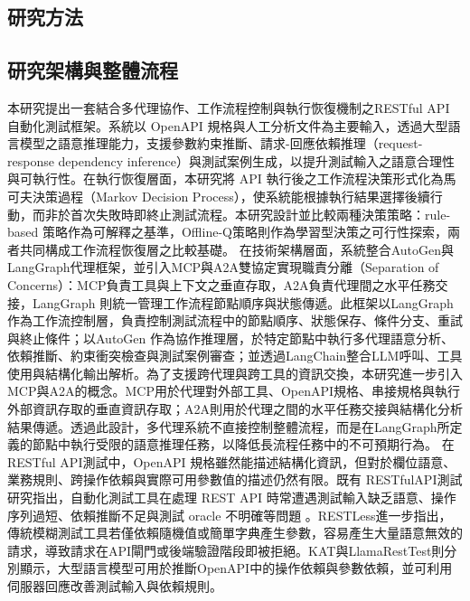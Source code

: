 \begin{ZhChapter}

\chapter{研究方法}

\section{研究架構與整體流程}

\text 本研究提出一套結合多代理協作、工作流程控制與執行恢復機制之RESTful API 自動化測試框架。系統以 OpenAPI 規格與人工分析文件為主要輸入，透過大型語言模型之語意推理能力，支援參數約束推斷、請求-回應依賴推理（request-response dependency inference）與測試案例生成，以提升測試輸入之語意合理性與可執行性。在執行恢復層面，本研究將 API 執行後之工作流程決策形式化為馬可夫決策過程（Markov Decision Process），使系統能根據執行結果選擇後續行動，而非於首次失敗時即終止測試流程。本研究設計並比較兩種決策策略：rule-based 策略作為可解釋之基準，Offline-Q策略則作為學習型決策之可行性探索，兩者共同構成工作流程恢復層之比較基礎。
\text 在技術架構層面，系統整合AutoGen與LangGraph代理框架，並引入MCP與A2A雙協定實現職責分離（Separation of Concerns）：MCP負責工具與上下文之垂直存取，A2A負責代理間之水平任務交接，LangGraph 則統一管理工作流程節點順序與狀態傳遞。\text 此框架以LangGraph作為工作流控制層，負責控制測試流程中的節點順序、狀態保存、條件分支、重試與終止條件；以AutoGen 作為協作推理層，於特定節點中執行多代理語意分析、依賴推斷、約束衝突檢查與測試案例審查；並透過LangChain整合LLM呼叫、工具使用與結構化輸出解析。為了支援跨代理與跨工具的資訊交換，本研究進一步引入MCP與A2A的概念。MCP用於代理對外部工具、OpenAPI規格、串接規格與執行外部資訊存取的垂直資訊存取；A2A則用於代理之間的水平任務交接與結構化分析結果傳遞。透過此設計，多代理系統不直接控制整體流程，而是在LangGraph所定義的節點中執行受限的語意推理任務，以降低長流程任務中的不可預期行為。
\text 在RESTful API測試中，OpenAPI 規格雖然能描述結構化資訊，但對於欄位語意、業務規則、跨操作依賴與實際可用參數值的描述仍然有限。既有 RESTfulAPI測試研究指出，自動化測試工具在處理 REST API 時常遭遇測試輸入缺乏語意、操作序列過短、依賴推斷不足與測試 oracle 不明確等問題 \parencite{Golmohammadi2024Testing, Zhang2024Open, OracleProblemSurvey}。RESTLess進一步指出，傳統模糊測試工具若僅依賴隨機值或簡單字典產生參數，容易產生大量語意無效的請求，導致請求在API閘門或後端驗證階段即被拒絕\parencite{Zheng2024RESTLess}。KAT與LlamaRestTest則分別顯示，大型語言模型可用於推斷OpenAPI中的操作依賴與參數依賴，並可利用伺服器回應改善測試輸入與依賴規則\parencite{Nguyen2024KAT, Kim2025LlamaRestTest}。

\end{ZhChapter}
